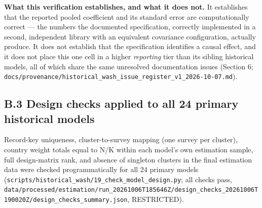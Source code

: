 \textbf{What this verification establishes, and what it does not.} It establishes that the reported pooled coefficient and its standard error are computationally correct --- the numbers the documented specification, correctly implemented in a second, independent library with an equivalent covariance configuration, actually produce. It does not establish that the specification identifies a causal effect, and it does not place this one cell in a higher \textit{reporting} tier than its sibling historical models, all of which share the same unresolved documentation issues (Section 6; \texttt{docs/\allowbreak{}provenance/\allowbreak{}historical\_\allowbreak{}wash\_\allowbreak{}issue\_\allowbreak{}register\_\allowbreak{}v1\_\allowbreak{}2026-\allowbreak{}10-\allowbreak{}07.\allowbreak{}md}).

\subsection*{B.3 Design checks applied to all 24 primary historical models}

Record-key uniqueness, cluster-to-survey mapping (one survey per cluster), country weight totals equal to N/K within each model's own estimation sample, full design-matrix rank, and absence of singleton clusters in the final estimation data were checked programmatically for all 24 primary models (\texttt{scripts/\allowbreak{}historical\_\allowbreak{}wash/\allowbreak{}19\_\allowbreak{}check\_\allowbreak{}model\_\allowbreak{}design.\allowbreak{}py}; all checks pass, \texttt{data/\allowbreak{}processed/\allowbreak{}estimation/\allowbreak{}run\_\allowbreak{}20261006T185646Z/\allowbreak{}design\_\allowbreak{}checks\_\allowbreak{}20261006T190020Z/\allowbreak{}design\_\allowbreak{}checks\_\allowbreak{}summary.\allowbreak{}json}, RESTRICTED).
